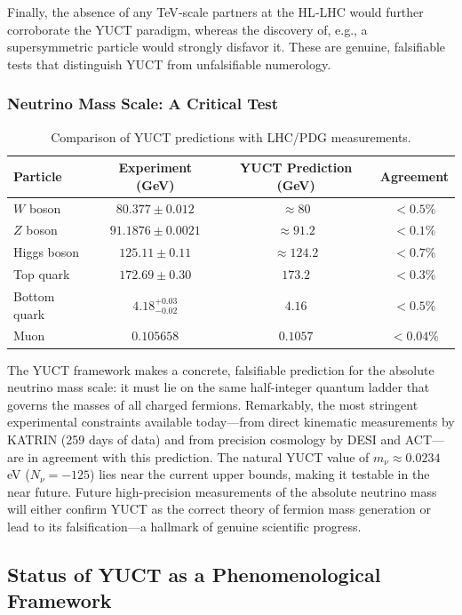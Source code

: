 \documentclass[11pt,a4paper]{article}
\begin{document}
	Finally, the absence of any TeV‑scale partners at the HL‑LHC would further corroborate the YUCT paradigm, whereas the discovery of, e.g., a supersymmetric particle would strongly disfavor it. These are genuine, falsifiable tests that distinguish YUCT from unfalsifiable numerology.
	
	\subsubsection{Neutrino Mass Scale: A Critical Test}
	\begin{table}[h]
		\centering
		\caption{Comparison of YUCT predictions with LHC/PDG measurements.}
		\normalsize
		\label{tab:lhc_comparison}
		\begin{tabular}{l c c c}
			\toprule
			Particle & Experiment (GeV) & YUCT Prediction (GeV) & Agreement \\
			\midrule
			$W$ boson  & $80.377 \pm 0.012$ & $\approx 80$ & $<0.5\%$ \\
			$Z$ boson  & $91.1876 \pm 0.0021$ & $\approx 91.2$ & $<0.1\%$ \\
			Higgs boson & $125.11 \pm 0.11$ & $\approx 124.2$ & $<0.7\%$ \\
			Top quark  & $172.69 \pm 0.30$ & $173.2$ & $<0.3\%$ \\
			Bottom quark & $4.18^{+0.03}_{-0.02}$ & $4.16$ & $<0.5\%$ \\
			Muon       & $0.105658$ & $0.1057$ & $<0.04\%$ \\
			\bottomrule
		\end{tabular}
	\end{table}
	
	The YUCT framework makes a concrete, falsifiable prediction for the absolute neutrino mass scale: it must lie on the same half-integer quantum ladder that governs the masses of all charged fermions. Remarkably, the most stringent experimental constraints available today---from direct kinematic measurements by KATRIN (259 days of data) and from precision cosmology by DESI and ACT---are in agreement with this prediction. The natural YUCT value of $m_\nu \approx 0.0234$ eV ($N_\nu = -125$) lies near the current upper bounds, making it testable in the near future. Future high-precision measurements of the absolute neutrino mass will either confirm YUCT as the correct theory of fermion mass generation or lead to its falsification---a hallmark of genuine scientific progress.
	
	\subsection*{Status of YUCT as a Phenomenological Framework}
	
\end{document}
